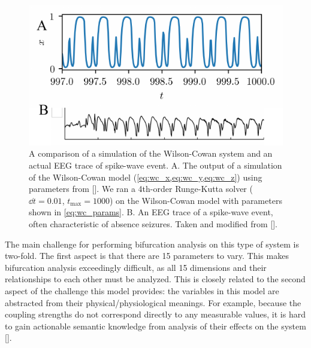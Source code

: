 \begin{figure}[ht]
  \centering
  \includegraphics[width=\columnwidth]{figure/wc.pdf}
  \caption[Wilson-Cowan simulation and spike-wave event]{A comparison of a simulation of the Wilson-Cowan system and an actual EEG trace of spike-wave event.
    A. The output of a simulation of the Wilson-Cowan model (\cref{eq:wc_x,eq:wc_y,eq:wc_z}) using parameters from [].
    We ran a 4th-order Runge-Kutta solver ($\dd{t} = 0.01$, $t_{\text{max}} = 1000$) on the Wilson-Cowan model with parameters shown in \cref{eq:wc_params}.
    B. An EEG trace of a spike-wave event, often characteristic of absence seizures.
    Taken and modified from [].
  }
  \label{fig:wc_and_swe}
\end{figure}

The main challenge for performing bifurcation analysis on this type of system is two-fold.
The first aspect is that there are 15 parameters to vary.
This makes bifurcation analysis exceedingly difficult, as all 15 dimensions and their relationships to each other must be analyzed.
This is closely related to the second aspect of the challenge this model provides: the variables in this model are abstracted from their physical/physiological meanings.
For example, because the coupling strengths do not correspond directly to any measurable values, it is hard to gain actionable semantic knowledge from analysis of their effects on the system [].

